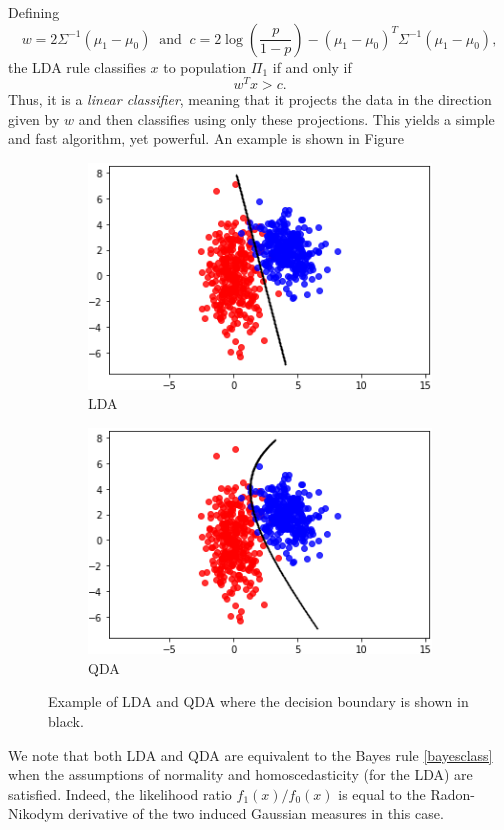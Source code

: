 \documentclass[10pt, a4paper]{report}
\theoremstyle{definition}
\theoremstyle{remark}
\begin{document}
Defining 
$$w = 2\Sigma^{-1}(\mu_1-\mu_0) \ \text{ and } \ c = 2\log\left(\frac{p}{1-p}\right) - (\mu_1-\mu_0)^T\Sigma^{-1} (\mu_1-\mu_0),$$
the LDA rule classifies $x$ to population $\Pi_1$ if and only if
$$w^Tx>c.$$
Thus, it is a \emph{linear classifier}, meaning that it projects the data in the direction given by $w$ and then classifies using only these projections. This yields a simple and fast algorithm, yet powerful. An example is shown in Figure 
\begin{figure}[H]
	\centering
	\begin{subfigure}{.5\textwidth}
		\centering
		\includegraphics[width=.8\linewidth]{Code/images/42/LDAex}
		\caption{LDA}
	\end{subfigure}%
	\begin{subfigure}{.5\textwidth}
		\centering
		\includegraphics[width=.8\linewidth]{Code/images/42/QDAex}
		\caption{QDA}
	\end{subfigure}
	\caption{Example of LDA and QDA where the decision boundary is shown in black.}
	\label{fig:LQDAex}
\end{figure}
We note that both LDA and QDA are equivalent to the Bayes rule \ref{bayesclass} when the assumptions of normality and homoscedasticity (for the LDA) are satisfied. Indeed, the likelihood ratio $f_1(x)/f_0(x)$ is equal to the Radon-Nikodym derivative of the two induced Gaussian measures in this case.
\end{document}
